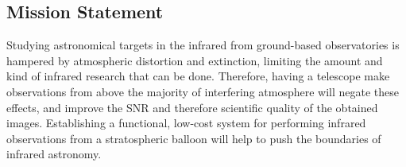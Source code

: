 \subsection{Mission Statement}

Studying astronomical targets in the infrared from ground-based observatories is hampered by atmospheric distortion and extinction, limiting the amount and kind of infrared research that can be done. Therefore, having a telescope make observations from above the majority of interfering atmosphere will negate these effects, and improve the SNR and therefore scientific quality of the obtained images. Establishing a functional, low-cost system for performing infrared observations from a stratospheric balloon will help to push the boundaries of infrared astronomy. 
